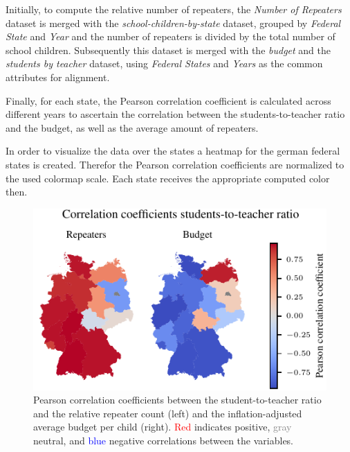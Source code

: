 Initially, to compute the relative number of repeaters, the \textit{Number of Repeaters} dataset is merged with the \textit{school-children-by-state} dataset, grouped by \textit{Federal State} and \textit{Year} and the number of repeaters is divided by the total number of school children. Subsequently this dataset is merged with the \textit{budget} and the \textit{students by teacher} dataset, using \textit{Federal States} and \textit{Years} as the common attributes for alignment. 

Finally, for each state, the Pearson correlation coefficient is calculated across different years to ascertain the correlation between the students-to-teacher ratio and the budget, as well as the average amount of repeaters.

In order to visualize the data over the states a heatmap for the german federal states is created. Therefor the Pearson correlation coefficients are normalized to the used colormap scale. Each state receives the appropriate computed color then.

\begin{figure}[h]
    \centering
    \includegraphics{fig/fig_heatmap_correlation_students_per_teacher_repeaters_budget.pdf}
    \caption{Pearson correlation coefficients between the student-to-teacher ratio and the relative repeater count (left) and the inflation-adjusted average budget per child (right). \textcolor{red}{Red} indicates positive, \textcolor{gray}{gray} neutral, and \textcolor{blue}{blue} negative correlations between the variables.}
    \label{fig:heatmap_correlation_students_per_teacher_repeaters_budget}
\end{figure}
